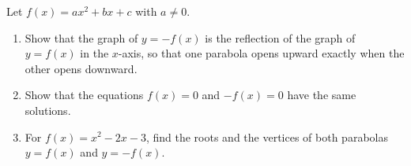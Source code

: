 Let $f(x)=ax^2+bx+c$ with $a\ne0$.
\begin{enumerate}
\item[(a)] Show that the graph of $y=-f(x)$ is the reflection of the graph of $y=f(x)$ in the $x$-axis, so that one parabola opens upward exactly when the other opens downward.
\item[(b)] Show that the equations $f(x)=0$ and $-f(x)=0$ have the same solutions.
\item[(c)] For $f(x)=x^2-2x-3$, find the roots and the vertices of both parabolas $y=f(x)$ and $y=-f(x)$.
\end{enumerate}
